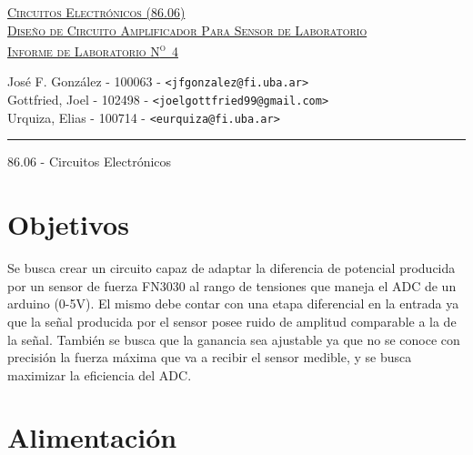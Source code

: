 \documentclass[a4paper, 10pt, spanish]{article}
\begin{document}
\begin{titlepage}
\vfill

\begin{center} %
\Large{\underline{\textsc{Circuitos Electrónicos (86.06)}}}\\ \vspace{0.5cm}
\Large{\underline{\textsc{Diseño de Circuito Amplificador Para Sensor de Laboratorio}}}\\ \vspace{0.5cm}
\Large{\underline{\textsc{Informe de Laboratorio N\textsuperscript{o}~4}}}
\end{center}

\vfill

\begin{center}
\large{José F. González - 100063 - \footnotesize{\verb!<jfgonzalez@fi.uba.ar>!}}\\ \vspace{0.25cm}
\large{Gottfried, Joel - 102498 - \footnotesize{\verb!<joelgottfried99@gmail.com>!}}\\\vspace{0.25cm}
\large{Urquiza, Elias - 100714 - \footnotesize{\verb!<eurquiza@fi.uba.ar>!}}\\
\end{center}

\vfill

\hrule
\vspace{0.2cm}

\noindent\small{86.06 - Circuitos Electrónicos \hfill }

\end{titlepage}

%
%
\tableofcontents
\newpage


\section{Objetivos}
    Se busca crear un circuito capaz de adaptar la diferencia de potencial producida por un sensor de fuerza FN3030 al rango de tensiones que maneja el ADC de un arduino (0-5V). El mismo debe contar con una etapa diferencial en la entrada ya que la señal producida por el sensor posee ruido de amplitud comparable a la de la señal.
    También se busca que la ganancia sea ajustable ya que no se conoce con precisión la fuerza máxima que va a recibir el sensor medible, y se busca maximizar la eficiencia del ADC.

\section{Alimentación}
\end{document}
